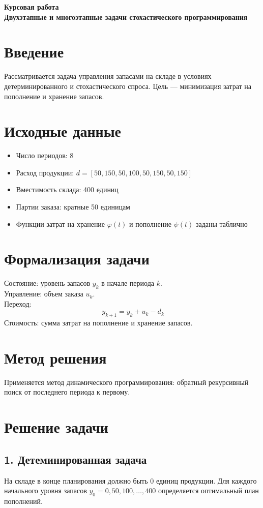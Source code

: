 \documentclass[12pt,a4paper]{article}
\begin{document}
\begin{center}
\Large \textbf{Курсовая работа} \\
\normalsize \textbf{Двухэтапные и многоэтапные задачи стохастического программирования}
\end{center}

\section*{Введение}
Рассматривается задача управления запасами на складе в условиях детерминированного и стохастического спроса. Цель --- минимизация затрат на пополнение и хранение запасов.

\section*{Исходные данные}
\begin{itemize}
    \item Число периодов: 8
    \item Расход продукции: $d = [50, 150, 50, 100, 50, 150, 50, 150]$
    \item Вместимость склада: 400 единиц
    \item Партии заказа: кратные 50 единицам
    \item Функции затрат на хранение $\varphi(t)$ и пополнение $\psi(t)$ заданы таблично
\end{itemize}

\section*{Формализация задачи}
Состояние: уровень запасов $y_k$ в начале периода $k$.\\
Управление: объем заказа $u_k$.\\
Переход: 
\[\
y_{k+1} = y_k + u_k - d_k
\]
Стоимость: сумма затрат на пополнение и хранение запасов.

\section*{Метод решения}
Применяется метод динамического программирования: обратный рекурсивный поиск от последнего периода к первому.

\section*{Решение задачи}

\subsection*{1. Детеминированная задача}
На складе в конце планирования должно быть 0 единиц продукции. Для каждого начального уровня запасов $y_0 = 0, 50, 100, \ldots, 400$ определяется оптимальный план пополнений.
\end{document}
